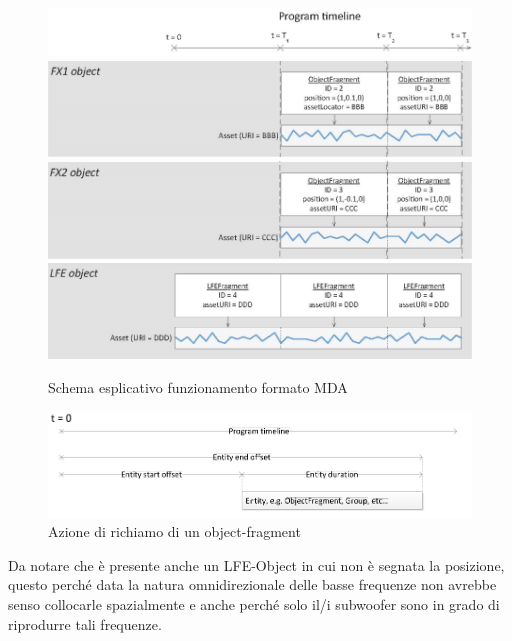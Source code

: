 \documentclass[12pt,a4paper]{report}
\begin{document}
\begin{figure}[htbp]
	\centering
	\includegraphics[scale=0.50]{figures/timeline.png}\\
	\includegraphics[scale=0.50]{figures/object1.png}\\
	\includegraphics[scale=0.50]{figures/object2.png}\\
	\includegraphics[scale=0.50]{figures/object3.png}
	\caption {Schema esplicativo funzionamento formato MDA}
	\label{fig:object}
	\end{figure}

\begin{figure}[htbp]
	\centering
	\includegraphics[scale=0.50]{figures/timeline2.png}

	\caption {Azione di richiamo di un object-fragment}
	\label{fig:time}
	\end{figure}

Da notare che è presente anche un LFE-Object in cui non è segnata la posizione, questo perché data la natura omnidirezionale delle basse frequenze non avrebbe senso collocarle spazialmente e anche perché solo il/i subwoofer sono in grado di riprodurre tali frequenze.
\end{document}
